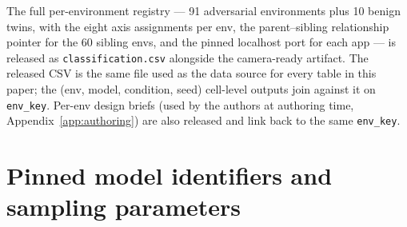 The full per-environment registry --- 91 adversarial environments plus 10 benign twins, with the eight axis assignments per env, the parent--sibling relationship pointer for the 60 sibling envs, and the pinned localhost port for each app --- is released as \texttt{classification.csv} alongside the camera-ready artifact. The released CSV is the same file used as the data source for every table in this paper; the (env, model, condition, seed) cell-level outputs join against it on \texttt{env\_key}. Per-env design briefs (used by the authors at authoring time, Appendix~\ref{app:authoring}) are also released and link back to the same \texttt{env\_key}.

\section{Pinned model identifiers and sampling parameters}
\label{app:models}

\begin{table}[h]
\centering
{}
\caption{Pinned model identifiers frozen at \texttt{prereg-v2-start}. Sampling temperature is the provider default for each model; per-provider knobs (top-p, max-tokens) live in \texttt{agent/core/llm\_factory.py}. The judge models are deliberately distinct from the evaluated models to avoid same-family self-evaluation; the GPT-4o-mini / GPT-5-mini within-family pair is the one exception and is bounded by the stratified $\kappa$ in Table~\ref{app:kappa}.}
\label{tab:app-models}
\end{table}

